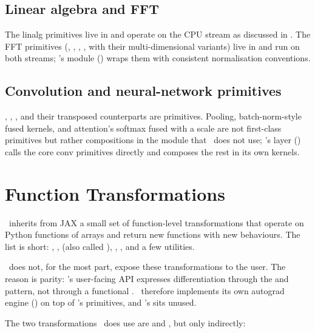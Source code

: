 \subsection{Linear algebra and FFT}
\label{ssec:mlx_runtime:linalg_fft}

The linalg primitives live in  and operate on
the CPU stream as discussed in
. The FFT primitives
(, , , , with their
multi-dimensional variants) live in  and run on
both streams; \Lucid's  module
() wraps them with consistent normalisation
conventions.

\subsection{Convolution and neural-network primitives}
\label{ssec:mlx_runtime:nn_prims}

, , , and their transposed
counterparts are primitives. Pooling, batch-norm-style fused kernels,
and attention's softmax fused with a scale are not first-class
primitives but rather compositions in the  module that
\Lucid\ does not use; \Lucid's  layer
() calls the core conv primitives
directly and composes the rest in its own kernels.

\section{Function Transformations}
\label{sec:mlx_runtime:transforms}

\MLX\ inherits from JAX a small set of function-level transformations
that operate on Python functions of arrays and return new functions
with new behaviours. The list is short: , ,
 (also called ), ,
, and a few utilities.

\Lucid\ does not, for the most part, expose these transformations to
the user. The reason is parity: 's user-facing API
expresses differentiation through the  and
 pattern, not through a functional
. \Lucid\ therefore implements its own autograd engine
() on top of \MLX's primitives, and
\MLX's  sits unused.

The two transformations \Lucid\ does use are  and
, but only indirectly:


